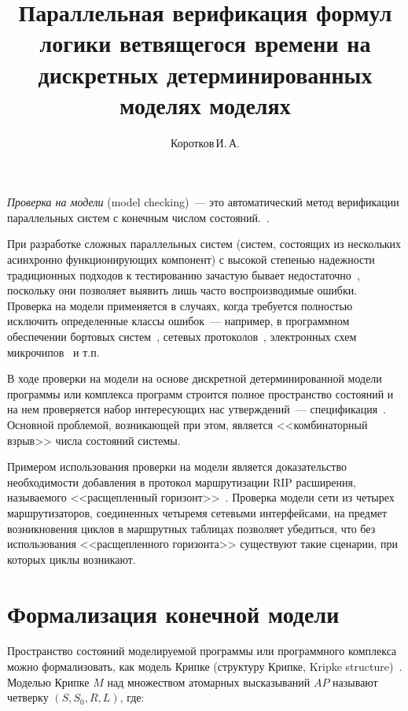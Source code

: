 \documentclass[a4paper,notitlepage,14pt]{article}
\title{Параллельная верификация формул логики ветвящегося времени на дискретных
  детерминированных моделях моделях} \author{Коротков\,И.\,А.}
\begin{document}
\maketitle

\emph{Проверка на модели} (model checking)~--- это автоматический метод верификации
параллельных систем с конечным числом состояний.~\cite{Clarke}.

При разработке сложных параллельных систем (систем, состоящих из нескольких асинхронно
функционирующих компонент) с высокой степенью надежности традиционных подходов к
тестированию зачастую бывает недостаточно~\cite{Clarke}, поскольку они позволяет выявить
лишь часто воспроизводимые ошибки. Проверка на модели применяется в случаях, когда
требуется полностью исключить определенные классы ошибок~--- например, в программном
обеспечении бортовых систем~\cite{Havelund98formalanalysis,CamaraArincModel}, сетевых
протоколов~\cite{RipOnSpin}, электронных схем микрочипов~\cite{Glazberg_psl:beyond} и т.п.

В ходе проверки на модели на основе дискретной детерминированной модели программы или
комплекса программ строится полное пространство состояний и на нем проверяется набор
интересующих нас утверждений~--- спецификация~\cite{Velder}. Основной проблемой,
возникающей при этом, является <<комбинаторный взрыв>> числа состояний
системы\cite{Clarke}.

Примером использования проверки на модели является доказательство необходимости добавления
в протокол маршрутизации RIP расширения, называемого <<расщепленный
горизонт>>~\cite{Black00:IP}. Проверка модели сети из четырех маршрутизаторов, соединенных
четыремя сетевыми интерфейсами, на предмет возникновения циклов в маршрутных таблицах
позволяет убедиться, что без использования <<расщепленного горизонта>> существуют такие
сценарии, при которых циклы возникают.~\cite{RipOnSpin}


\section{Формализация конечной модели}
\label{sec:modelchecking}

Пространство состояний моделируемой программы или программного комплекса можно
формализовать, как модель Крипке (структуру Крипке, Kripke
structure)~\cite{Clarke}. Моделью Крипке $M$ над множеством атомарных высказываний $AP$
называют четверку $(S, S_0, R, L)$, где:
\end{document}
